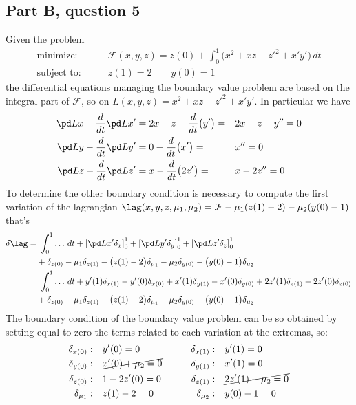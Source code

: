 \subsection*{Part B, question 5}
	Given the problem
	\begin{align*}
		\textrm{minimize:} \qquad & \mathcal F(x,y,z) = z(0) + \int_0^1 \Big(x^2 + xz +z'^2 + x'y'\Big)\, dt \\
		\textrm{subject to:} \qquad & z(1) = 2 \qquad y(0) = 1
	\end{align*}
	the differential equations managing the boundary value problem are based on the integral part of $\mathcal F$, so on $L(x,y,z) = x^2 + xz + z'^2 + x'y'$. In particular we have
	\begin{align*}
		\pd L x - \frac d{dt}\pd L{x'} & = 2x - z - \frac d{dt}\big(y'\big)= && 2x - z - y'' = 0 \\
		\pd L y - \frac d{dt}\pd L{y'} & = 0 - \frac d{dt}\big(x'\big) =&& x'' = 0 \\
		\pd L z - \frac d{dt}\pd L{z'} & = x - \frac d{dt}\big(2z'\big) =&& x - 2 z'' = 0 \\
	\end{align*}
	To determine the other boundary condition is necessary to compute the first variation of the lagrangian $\lag(x,y,z,\mu_1,\mu_2) = \mathcal F - \mu_1(z(1)-2) - \mu_2(y(0)-1)$ that's
	\begin{align*}
		\delta \lag = & \ \int_0^1 \dots\, dt + \left[\pd L {x'} \delta_x\right]_0^1 + \left[\pd L {y'} \delta_y\right]_0^1 + \left[\pd L {z'} \delta_z\right]_0^1  \\ & + \delta_{z(0)} - \mu_1 \delta_{z(1)} - \big(z(1)-2\big) \delta_{\mu_1} - \mu_2 \delta_{y(0)} - \big(y(0) - 1\big) \delta_{\mu_2} \\
		= & \ \int_0^1 \dots \, dt + y'(1) \delta_{x(1)} - y'(0)\delta_{x(0)} + x'(1) \delta_{y(1)} - x'(0) \delta_{y(0)} + 2z'(1)\delta_{z(1)} - 2z'(0) \delta_{z(0)}\\ & + \delta_{z(0)} - \mu_1 \delta_{z(1)} - \big(z(1)-2\big) \delta_{\mu_1} - \mu_2 \delta_{y(0)} - \big(y(0) - 1\big) \delta_{\mu_2} \\ 
	\end{align*}
	The boundary condition of the boundary value problem can be so obtained by setting equal to zero the terms related to each variation at the extremas, so:
	\begin{align*}
		\delta_{x(0)}: \quad & y'(0) = 0 \qquad & \delta_{x(1)}:& \quad  y'(1) = 0\\
		\delta_{y(0)}: \quad & \cancel{x'(0)+\mu_2 = 0} \qquad & \delta_{y(1)}:& \quad  x'(1) = 0 \\
		\delta_{z(0)}: \quad & 1 - 2z'(0) = 0 \qquad & \delta_{z(1)}:& \quad  \cancel{2z'(1)-\mu_2 = 0 } \\
		\delta_{\mu_1}: \quad & z(1) - 2 = 0 \qquad & \delta_{\mu_2}:& \quad  y(0) - 1 = 0 
	\end{align*}


